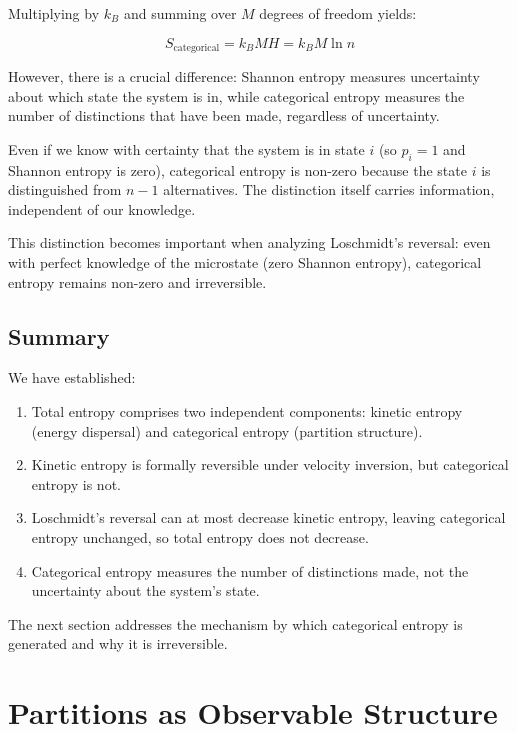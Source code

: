\documentclass[twocolumn,10pt]{article}
\theoremstyle{definition}
\theoremstyle{remark}
\begin{document}
Multiplying by $k_B$ and summing over $M$ degrees of freedom yields:

$$
S_{\text{categorical}} = k_B M H = k_B M \ln n
$$

However, there is a crucial difference: Shannon entropy measures uncertainty about which state the system is in, while categorical entropy measures the number of distinctions that have been made, regardless of uncertainty.

Even if we know with certainty that the system is in state $i$ (so $p_i = 1$ and Shannon entropy is zero), categorical entropy is non-zero because the state $i$ is distinguished from $n-1$ alternatives. The distinction itself carries information, independent of our knowledge.

This distinction becomes important when analyzing Loschmidt's reversal: even with perfect knowledge of the microstate (zero Shannon entropy), categorical entropy remains non-zero and irreversible.

\subsection{Summary}

We have established:

\begin{enumerate}
\item Total entropy comprises two independent components: kinetic entropy (energy dispersal) and categorical entropy (partition structure).

\item Kinetic entropy is formally reversible under velocity inversion, but categorical entropy is not.

\item Loschmidt's reversal can at most decrease kinetic entropy, leaving categorical entropy unchanged, so total entropy does not decrease.

\item Categorical entropy measures the number of distinctions made, not the uncertainty about the system's state.
\end{enumerate}

The next section addresses the mechanism by which categorical entropy is generated and why it is irreversible.

\section{Partitions as Observable Structure}
\label{sec:partitions}
\end{document}
